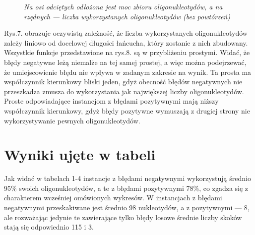 \documentclass{article}
\begin{document}
\begin{figure}[!htbp]
\caption{\textit{Na osi odciętych odłożona jest moc zbioru oligonukleotydów, a na rzędnych --- liczba wykorzystanych oligonukleotydów (bez powtórzeń)}}
\end{figure}

Rys.7. obrazuje oczywistą zależność, że liczba wykorzystanych oligonukleotydów zależy liniowo od docelowej długości łańcucha, który zostanie z nich zbudowany.
Wszystkie funkcje przedstawione na rys.8. są w przybliżeniu prostymi. 
Widać, że błędy negatywne leżą niemalże na tej samej prostej, a więc można podejrzewać, że umiejscowienie błędu nie wpływa w zadanym zakresie na wynik.
Ta prosta ma współczynnik kierunkowy bliski jeden, gdyż obecność błędów negatywnych nie przeszkadza zmusza do wykorzystania jak największej liczby oligonukleotydów.
Proste odpowiadające instancjom z błędami pozytywnymi  mają niższy współczynnik kierunkowy, gdyż błędy pozytywne wymuszają z drugiej strony nie wykorzystywanie pewnych oligonukleotydów.

\section{Wyniki ujęte w tabeli}

Jak widać w tabelach 1-4 instancje z błędami negatywnymi wykorzystują średnio 95\% swoich oligonukleotydów, a te z błędami pozytywnymi 78\%, co zgadza się z charakterem wcześniej omówionych wykresów.
W instancjach z błędami negatywnymi przeskakiwane jest średnio 98 nukleotydów, a z pozytywnymi --- 8, ale rozważając jedynie te zawierające tylko błędy losowe średnie liczby skoków stają się odpowiednio 115 i 3.
\end{document}
